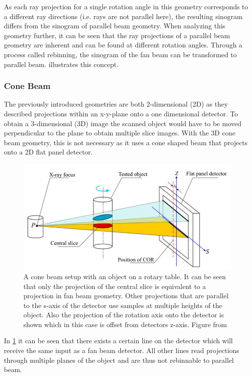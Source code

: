 \documentclass[10pt,journal,compsoc]{IEEEtran}
\begin{document}
As each ray projection for a single rotation angle in this geometry corresponds to a different ray directions (i.e. rays are not parallel here), the resulting sinogram differs from the sinogram of parallel beam geometry.
When analyzing this geometry further, it can be seen that the ray projections of a parallel beam geometry are inherent and can be found at different rotation angles.
Through a process called rebinning, the sinogram of the fan beam can be transformed to parallel beam.
 illustrates this concept.
 

\subsubsection{Cone Beam}
The previously introduced geometries are both 2-dimensional (2D) as they described projections within an x-y-plane onto a one dimensional detector.
To obtain a 3-dimensional (3D) image the scanned object would have to be moved perpendicular to the plane to obtain multiple slice images.
With the 3D cone beam geometry, this is not necessary as it uses a cone shaped beam that projects onto a 2D flat panel detector.
%
\begin{figure}
\centering
\includegraphics[width=\linewidth]{img/conebeam_centralslice.png}
\caption{
A cone beam setup with an object on a rotary table.
It can be seen that only the projection of the central slice is equivalent to a projection in fan beam geometry.
Other projections that are parallel to the s-axis of the detector use samples at multiple heights of the object.
Also the projection of the rotation axis onto the detector is shown which in this case is offset from detectors
z-axis.
Figure from \cite{Yang2011}
}
\label{fig:conebeam}
\end{figure}
%
In \cref{fig:conebeam} it can be seen that there exists a certain line on the detector which will receive the same input as a fan beam detector.
All other lines read projections through multiple planes of the object and are thus not rebinnable to parallel beam.
\end{document}
